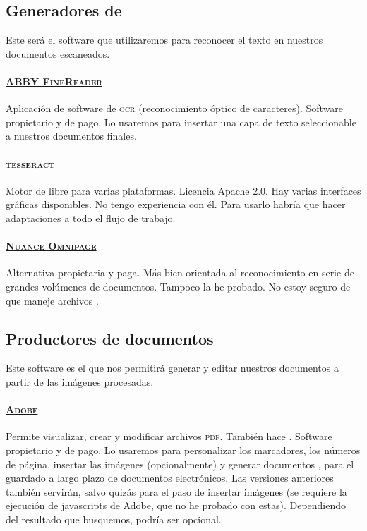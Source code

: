 \documentclass[%
	a5paper,
	10pt,
	twoside,
	openright,
	final,
]{memoir}
\begin{document}
	\subsection{Generadores de \texorpdfstring{\ocr}{OCR}} Este será el software que utilizaremos para reconocer el texto en nuestros documentos escaneados.
	\paragraph{\href{https://www.abbyy.com/es-es/finereader/}{\textsc{ABBY FineReader}}} Aplicación de software de \textsc{ocr} (reconocimiento óptico de caracteres). Software propietario y de pago. Lo usaremos para insertar una capa de texto seleccionable a nuestros documentos finales.
	\paragraph{\href{https://github.com/tesseract-ocr/tesseract}{\textsc{tesseract}}} Motor de \ocr libre para varias plataformas. Licencia Apache 2.0. Hay varias interfaces gráficas disponibles. No tengo experiencia con él. Para usarlo habría que hacer adaptaciones a todo el flujo de trabajo.
	\paragraph{\href{https://www.nuance.com/print-capture-and-pdf-solutions/optical-character-recognition/omnipage.html}{\textsc{Nuance Omnipage}}} Alternativa propietaria y paga. Más bien orientada al reconocimiento en serie de grandes volúmenes de documentos. Tampoco la he probado. No estoy seguro de que maneje archivos \djvu.

	\subsection{Productores de documentos} Este software es el que nos permitirá generar y editar nuestros documentos a partir de las imágenes procesadas.
	\paragraph{\href{https://acrobat.adobe.com/es/es/acrobat.html}{\textsc{Adobe} \acrobat}} Permite visualizar, crear y modificar archivos \textsc{pdf}. También hace \ocr. Software propietario y de pago. Lo usaremos para personalizar los marcadores, los números de página, insertar las imágenes (opcionalmente) y generar documentos \pdfa, para el guardado a largo plazo de documentos electrónicos. Las versiones anteriores también servirán, salvo quizás para el paso de insertar imágenes (se requiere la ejecución de javascripts de Adobe, que no he probado con estas). Dependiendo del resultado que busquemos, podría ser opcional.
\end{document}
